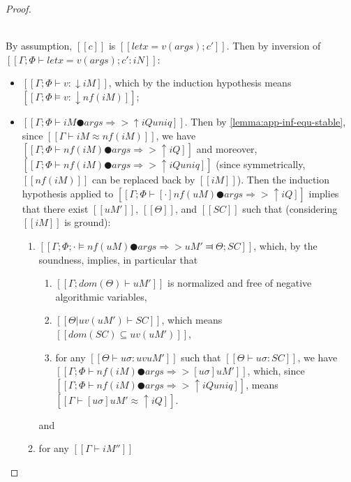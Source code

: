 \begin{proof}
\begin{caseof}
        \item {}\\
            By assumption, $[[c]]$ is $[[let x = v(args); c']]$. 
            Then by inversion of
            $[[Γ ; Φ ⊢ let x = v(args); c' : iN]]$: 
            \begin{itemize}
                \item $[[Γ ; Φ ⊢ v : ↓iM]]$, 
                    which by the induction hypothesis means 
                    $[[Γ; Φ ⊨ v : ↓nf(iM)]]$;
                \item $[[Γ ; Φ ⊢ iM ● args ⇒> ↑iQ uniq]]$. 
                    Then by \cref{lemma:app-inf-equ-stable}, since 
                    $[[Γ ⊢ iM ≈ nf(iM)]]$, we have
                    $[[Γ ; Φ ⊢ nf(iM) ● args ⇒> ↑iQ]]$
                    and moreover, $[[Γ ; Φ ⊢ nf(iM) ● args ⇒> ↑iQ uniq]]$
                    (since symmetrically, $[[nf(iM)]]$ can be replaced back by $[[iM]]$).
                    Then the induction hypothesis applied to 
                    $[[Γ ; Φ ⊢ [·]nf(uM) ● args ⇒> ↑iQ]]$
                    implies that there exist $[[uM']]$, $[[Θ]]$, and $[[SC]]$ such that
                    (considering $[[iM]]$ is ground):
                    \begin{enumerate}
                        \item $[[ Γ; Φ; · ⊨ nf(uM) ● args ⇒> uM' ⫤ Θ; SC ]]$, 
                            which, by the soundness, implies, in particular
                            that 
                            \begin{enumerate}
                                \item $[[Γ; dom(Θ) ⊢  uM']]$ is normalized and 
                                    free of negative algorithmic variables, 
                                \item $[[Θ|uv(uM') ⊢ SC]]$, which means $[[dom(SC) ⊆ uv(uM')]]$,
                                \item \label{point:typing-completeness:AppLet:ih-sound} 
                                    for any $[[Θ ⊢ uσ : uv uM' ]]$ such that $[[ Θ ⊢ uσ : SC ]]$, 
                                    we have $[[ Γ ; Φ ⊢ nf(iM) ● args ⇒> [uσ]uM' ]]$,
                                    which, since $[[Γ ; Φ ⊢ nf(iM) ● args ⇒> ↑iQ uniq]]$,
                                    means $[[Γ ⊢ [uσ]uM' ≈ ↑iQ]]$.
                            \end{enumerate}
                            and
                        \item for any $[[Γ ⊢ iM'']]$

\end{enumerate}
\end{itemize}
\end{caseof}
\end{proof}
